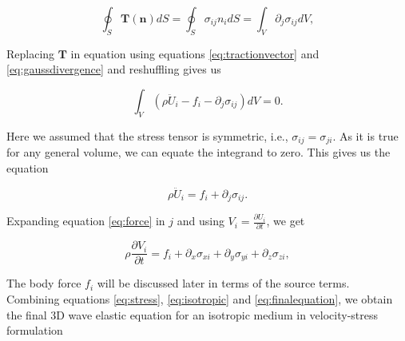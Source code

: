 \begin{equation}
    \oint_S \mathbf{T\left(n\right)}dS = \oint_S \sigma_{ij}n_idS = \int_V \partial_j \sigma_{ij}dV,
\label{eq:gaussdivergence}
\end{equation}

Replacing $\mathbf{T}$ in equation  using equations \ref{eq:tractionvector} and \ref{eq:gaussdivergence} and reshuffling gives us

\begin{equation}
    \int_V \left(\rho \ddot{U}_i - f_i - \partial_j \sigma_{ij}\right)dV = 0.
\end{equation}

Here we assumed that the stress tensor is symmetric, i.e., $\sigma_{ij}=\sigma_{ji}$. As it is true for any general volume, we can
equate the integrand to zero. This gives us the equation

\begin{equation}
    \rho \ddot{U}_i = f_i + \partial_j \sigma_{ij}.
    \label{eq:force}
\end{equation}

Expanding equation \ref{eq:force} in $j$ and using $V_i = \frac{\partial U_i}{\partial t}$, we get

\begin{equation}
    \rho \frac{\partial V_i}{\partial t} = f_i + \partial_x \sigma_{xi} + \partial_y \sigma_{yi} + \partial_z \sigma_{zi},
    \label{eq:finalequation}
\end{equation}

The body force $f_i$ will be discussed later in terms of the source terms. \\

Combining equations \ref{eq:stress}, \ref{eq:isotropic} and \ref{eq:finalequation}, we obtain the final 3D 
wave elastic equation for an isotropic medium in velocity-stress formulation

